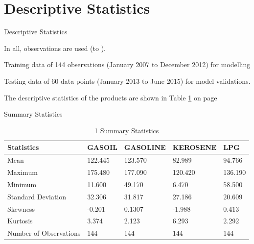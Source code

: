 \documentclass{beamer}
\begin{document}
	
	\section{Descriptive Statistics}
	\label{sec:Descriptive}
	\begin{frame}{Descriptive Statistics}
		\begin{block}{}
			\vspace{4pt}
			In all, \numOfObservations observations are used (\startDate to \finishDate). \vspace{4pt}
		\end{block} \vspace{5pt}
		
		\begin{block}{}
		Training data of 144 observations (January 2007 to December 2012) for modelling \\ \vspace{5pt}
		
		Testing data of 60 data points (January 2013 to June 2015) for model validations.
		\end{block} \vspace{5pt}
	
		\begin{block}{}
			The descriptive statistics of the products are shown in Table \ref{table:description} on page \pageref{table:description}
		\end{block}
	\end{frame}

	\begin{frame}{Summary Statistics}
		\begin{table}[]
			\caption{ \ref{table:description} Summary Statistics}
			\begin{tabular}{lllll}
\hline
Statistics             & GASOIL  & GASOLINE & KEROSENE & LPG     \\ \hline
Mean                   & 122.445 & 123.570  & 82.989   & 94.766  \\
Maximum                & 175.480 & 177.090  & 120.420  & 136.190 \\
Minimum                & 11.600  & 49.170   & 6.470    & 58.500  \\
Standard Deviation     & 32.306  & 31.817   & 27.186   & 20.609  \\ 
Skewness               & -0.201  & 0.1307   & -1.988   & 0.413   \\
Kurtosis               & 3.374   & 2.123    & 6.293    & 2.292   \\
Number of Observations & 144     & 144      & 144      & 144     \\ \hline
			\end{tabular}
			\label{table:description}
		\end{table}
	\end{frame}
\end{document}
